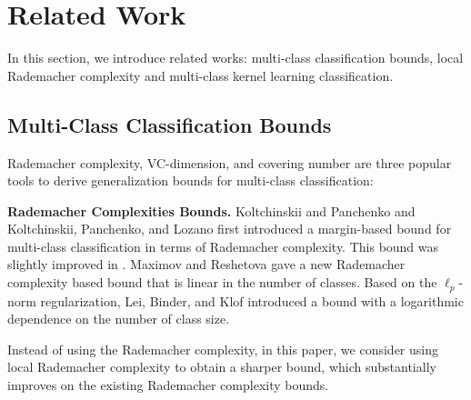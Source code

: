 \documentclass{article}
\begin{document}

\section{Related Work}
In this section,
we  introduce related works:
multi-class classification bounds,
local Rademacher complexity and multi-class kernel learning classification.

\subsection{Multi-Class Classification Bounds}
 Rademacher complexity, VC-dimension, and covering number are three
 popular tools to derive generalization bounds for multi-class classification:

\textbf{Rademacher Complexities Bounds.}
   Koltchinskii and Panchenko 
    and Koltchinskii, Panchenko, and Lozano 
    first introduced a margin-based bound for multi-class classification in terms of Rademacher complexity.
    This bound was slightly improved in \cite{mohri2012foundations,cortes2013multi}.
    Maximov and Reshetova \cite{maximov2016tight} gave a new Rademacher complexity based bound
    that is linear in the number of classes.
    Based on the $\ell_p$-norm regularization,
    Lei, Binder, and Klof  introduced a bound
    with a logarithmic dependence on the number of class size.

    Instead of using the Rademacher complexity,
    in this paper, we consider using local Rademacher complexity
    to obtain a sharper bound, which  substantially improves on
    the existing Rademacher complexity bounds.
\end{document}

